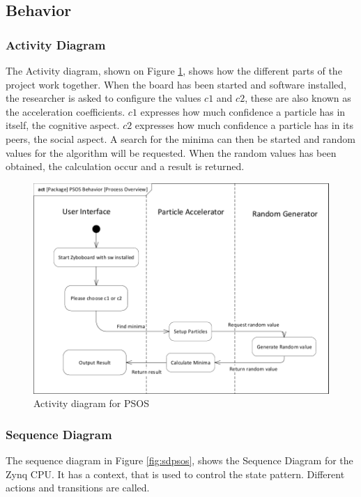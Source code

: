 \subsection{Behavior} \label{requirementspecification:Behavior}

\subsubsection{Activity Diagram}
The Activity diagram, shown on Figure \ref{fig:actpackagepsosbehaviorprocess-overview}, shows how the different parts of the project work together. When the board has been started and software installed, the researcher is asked to configure the values $c1$ and $c2$, these are also known as the acceleration coefficients. $c1$ expresses how much confidence a particle has in itself, the cognitive aspect. $c2$ expresses how much confidence a particle has in its peers, the social aspect. A search for the minima can then be started and random values for the algorithm will be requested. When the random values has been obtained, the calculation occur and a result is returned.

\begin{figure}[H]
	\centering
	\includegraphics[width=0.7\linewidth]{"diagram/act_Package_PSOS_Behavior_Process Overview"}
	\caption{Activity diagram for PSOS}
	\label{fig:actpackagepsosbehaviorprocess-overview}
\end{figure}

\subsubsection{Sequence Diagram}
The sequence diagram in Figure \ref{fig:sdpsos}, shows the Sequence Diagram for the Zynq CPU.
It has a context, that is used to control the state pattern. Different actions and transitions are called.

